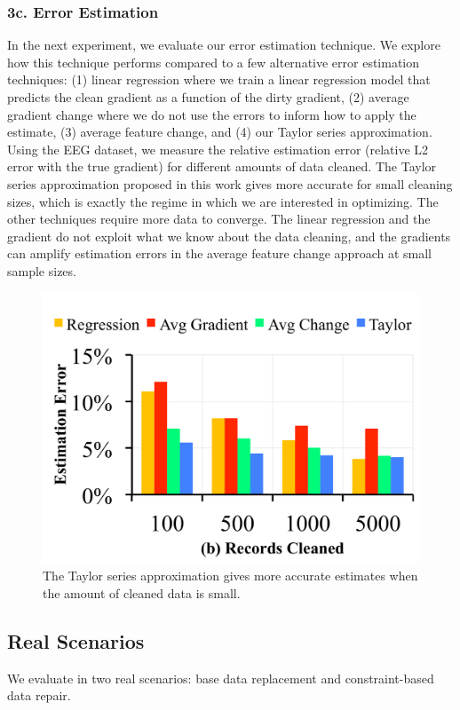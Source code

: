 \subsubsection{3c. Error Estimation}
In the next experiment, we evaluate our error estimation technique.
We explore how this technique performs compared to a few alternative error estimation techniques: (1) linear regression where we train a linear regression model that predicts the clean gradient as a function of the dirty gradient, (2) average gradient change where we do not use the errors to inform how to apply the estimate, (3) average feature change, and (4) our Taylor series approximation.
Using the EEG dataset, we measure the relative estimation error (relative L2 error with the true gradient) for different amounts of data cleaned.
The Taylor series approximation proposed in this work gives more accurate for small cleaning sizes, which is exactly the regime in which we are interested in optimizing.
The other techniques require more data to converge.
The linear regression and the gradient do not exploit what we know about the data cleaning, and the gradients can amplify estimation errors in the average feature change approach at small sample sizes.

\begin{figure}[ht!]
\centering
 \includegraphics[width=\columnwidth]{exp/exp12.pdf}
 \caption{The Taylor series approximation gives more accurate estimates when the amount of cleaned data is small. \label{tradeoffs3}}
\end{figure}

\subsection{Real Scenarios}
We evaluate \sys in two real scenarios: base data replacement and constraint-based data repair.

